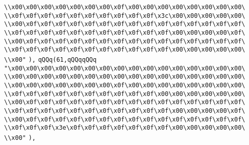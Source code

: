 \verb|\\x00\x00\x00\x00\x00\x00\x00\x0f\x00\x00\x00\x00\x00\x00\x00\x00\|\newline
\verb|\\x0f\x0f\x0f\x0f\x0f\x0f\x0f\x0f\x0f\x0f\x3c\x00\x00\x00\x00\x00\|\newline
\verb|\\x00\x0f\x0f\x0f\x0f\x0f\x0f\x0f\x0f\x0f\x0f\x0f\x0f\x0f\x0f\x0f\|\newline
\verb|\\x0f\x0f\x0f\x0f\x0f\x0f\x0f\x0f\x0f\x0f\x0f\x00\x00\x00\x00\x0f\|\newline
\verb|\\x00\x0f\x0f\x0f\x0f\x0f\x0f\x0f\x0f\x0f\x0f\x0f\x0f\x0f\x0f\x0f\|\newline
\verb|\\x0f\x0f\x0f\x0f\x0f\x0f\x0f\x0f\x0f\x0f\x0f\x00\x00\x00\x00\x00\|\newline
\verb|\\x00"|\newline
\verb|),|\newline
\verb|qQQq(61,qQQqqQQq|\newline
\verb|"\x00\x00\x00\x00\x00\x00\x00\x00\x00\x00\x00\x00\x00\x00\x00\x00\|\newline
\verb|\\x00\x00\x00\x00\x00\x00\x00\x00\x00\x00\x00\x00\x00\x00\x00\x00\|\newline
\verb|\\x00\x00\x00\x00\x00\x00\x00\x0f\x00\x00\x00\x00\x00\x00\x00\x00\|\newline
\verb|\\x0f\x0f\x0f\x0f\x0f\x0f\x0f\x0f\x0f\x0f\x00\x00\x00\x00\x00\x00\|\newline
\verb|\\x00\x0f\x0f\x0f\x0f\x0f\x0f\x0f\x0f\x0f\x0f\x0f\x0f\x0f\x0f\x0f\|\newline
\verb|\\x0f\x0f\x0f\x0f\x0f\x0f\x0f\x0f\x0f\x0f\x0f\x00\x00\x00\x00\x0f\|\newline
\verb|\\x00\x0f\x0f\x0f\x0f\x0f\x0f\x0f\x0f\x0f\x0f\x0f\x0f\x0f\x0f\x0f\|\newline
\verb|\\x0f\x0f\x0f\x3e\x0f\x0f\x0f\x0f\x0f\x0f\x0f\x00\x00\x00\x00\x00\|\newline
\verb|\\x00"|\newline
\verb|),|\newline
